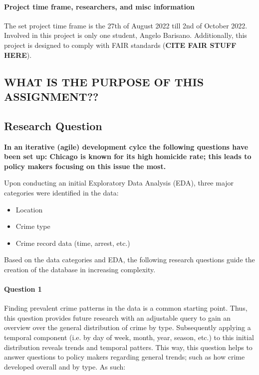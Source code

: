 \documentclass[a4paper]{article}
\begin{document}
\paragraph{Project time frame, researchers, and misc information} The set project time frame is the 27th of August 2022 till 2nd of October 2022. Involved in this project is only one student, Angelo Barisano. Additionally, this project is designed to comply with FAIR standards (\textbf{CITE FAIR STUFF HERE}).

\subsection{WHAT IS THE PURPOSE OF THIS ASSIGNMENT??}

\subsection{Research Question}

\textbf{In an iterative (agile) development cylce the following questions have been set up: Chicago is known for its high homicide rate; this leads to policy makers focusing on this issue the most. }

Upon conducting an initial Exploratory Data Analysis (EDA), three major categories were identified in the data: 

\begin{itemize}
  \item Location
  \item Crime type
  \item Crime record data (time, arrest, etc.)
\end{itemize}

Based on the data categories and EDA, the following research questions guide the creation of the database in increasing complexity. 

\paragraph{Question 1} Finding prevalent crime patterns in the data is a common starting point. Thus, this question provides future research with an adjustable query to gain an overview over the general distribution of crime by type. Subsequently applying a temporal component (i.e. by day of week,  month, year, season, etc.) to this initial distribution reveals trends and temporal patters. This way, this question helps to answer questions to policy makers regarding general trends; such as how crime developed overall and by type. As such:
\end{document}
